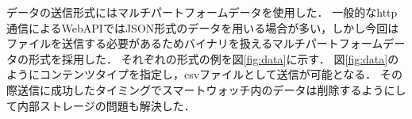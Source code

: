\begin{table}[ht]
    \centering
    \caption{角速度データの形式の例}
    \label{table:gyro}
\end{table}
データの送信形式にはマルチパートフォームデータを使用した．
一般的なhttp通信によるWebAPIではJSON形式のデータを用いる場合が多い，しかし今回はファイルを送信する必要があるためバイナリを扱えるマルチパートフォームデータの形式を採用した．
それぞれの形式の例を図\ref{fig:data}に示す．
図\ref{fig:data}のようにコンテンツタイプを指定し，csvファイルとして送信が可能となる．
その際送信に成功したタイミングでスマートウォッチ内のデータは削除するようにして内部ストレージの問題も解決した．

